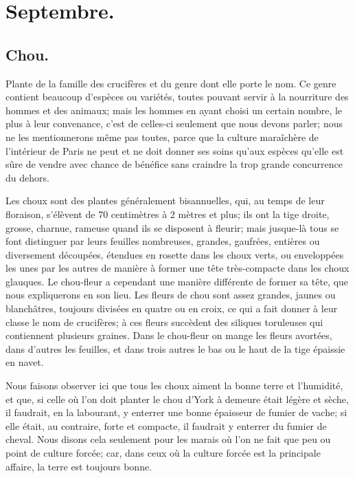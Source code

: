 \documentclass[10pt,a4paper]{book}
\begin{document}
\section{Septembre.}

\subsection{Chou.}\label{chou}

Plante de la famille des crucifères et du genre dont elle porte le nom. Ce genre contient beaucoup d'espèces ou variétés, toutes pouvant servir à la nourriture des hommes et des animaux; mais les hommes en ayant choisi un certain nombre, le plus à leur convenance, c'est de celles-ci seulement que nous devons parler; nous ne les mentionnerons même pas toutes, parce que la culture maraîchère de l'intérieur de Paris ne peut et ne doit donner ses soins qu'aux espèces qu'elle est sûre de vendre avec chance de bénéfice sans craindre la trop grande concurrence du dehors.

Les choux sont des plantes généralement bisannuelles, qui, au temps de leur floraison, s'élèvent de 70 centimètres à 2 mètres et plus; ils ont la tige droite, grosse, charnue, rameuse quand ils se disposent à fleurir; mais jusque-là tous se font distinguer par leurs feuilles nombreuses, grandes, gaufrées, entières ou diversement découpées, étendues en rosette dans les choux verts, ou enveloppées les unes par les autres de manière à former une tête très-compacte dans les choux glauques. Le chou-fleur a cependant une manière différente de former sa tête, que nous expliquerons en son lieu. Les fleurs de chou sont assez grandes, jaunes ou blanchâtres, toujours divisées en quatre ou en croix, ce qui a fait donner à leur classe le nom de crucifères; à ces fleurs succèdent des siliques toruleuses qui contiennent plusieurs graines. Dans le chou-fleur on mange les fleurs avortées, dans d'autres les feuilles, et dans trois autres le bas ou le haut de la tige épaissie en navet.

Nous faisons observer ici que tous les choux aiment la bonne terre et l'humidité, et que, si celle où l'on doit planter le chou d'York à demeure était légère et sèche, il faudrait, en la labourant, y enterrer une bonne épaisseur de fumier de vache; si elle était, au contraire, forte et compacte, il faudrait y enterrer du fumier de cheval. Nous disons cela seulement pour les marais où l'on ne fait que peu ou point de culture forcée; car, dans ceux où la culture forcée est la principale affaire, la terre est toujours bonne.
\end{document}
